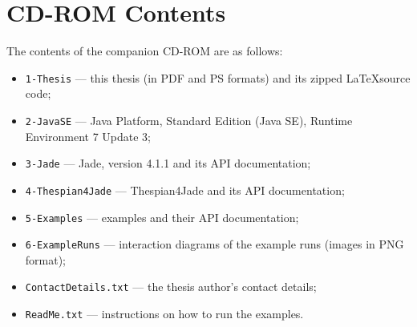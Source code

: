 
\chapter{CD-ROM Contents}

The contents of the companion CD-ROM are as follows:
\begin{itemize}
	\item \texttt{1-Thesis} --- this thesis (in PDF and PS formats) and its zipped \LaTeX source code;
	\item \texttt{2-JavaSE} --- Java Platform, Standard Edition (Java SE), Runtime Environment 7 Update 3;
	\item \texttt{3-Jade} --- Jade, version 4.1.1 and its API documentation;
	\item \texttt{4-Thespian4Jade} --- Thespian4Jade and its API documentation;
	\item \texttt{5-Examples} --- examples and their API documentation;
	\item \texttt{6-ExampleRuns} --- interaction diagrams of the example runs (images in PNG format);
	\item \texttt{ContactDetails.txt} --- the thesis author's contact details;
	\item \texttt{ReadMe.txt} --- instructions on how to run the examples.
\end{itemize}